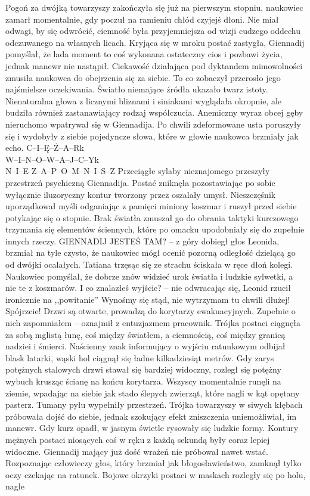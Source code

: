 \documentclass[../MAIN.tex]{subfiles}
\begin{document}
Pogoń za dwójką towarzyszy zakończyła się już na pierwszym stopniu, naukowiec zamarł momentalnie, gdy poczuł na ramieniu chłód czyjejś dłoni. Nie miał odwagi, by się odwrócić, ciemność była przyjemniejsza od wizji cudzego oddechu odczuwanego na własnych licach. Kryjąca się w mroku postać zastygła, Giennadij pomyślał, że lada moment to coś wykonana ostateczny cios i pozbawi życia, jednak manewr nie nastąpił. Ciekawość działająca pod dyktandem mimowolności zmusiła naukowca do obejrzenia się za siebie. To co zobaczył przerosło jego najśmielsze oczekiwania. Światło niemające źródła ukazało twarz istoty. Nienaturalna głowa z licznymi bliznami i siniakami wyglądała okropnie, ale budziła również zastanawiający rodzaj współczucia. Anemiczny wyraz obcej gęby nieruchomo wpatrywał się w Giennadija. Po chwili zdeformowane usta poruszyły się i wydobyły z siebie pojedyncze słowa, które w głowie naukowca brzmiały jak echo. 
\sw[14em]
C--I--Ę--Ż--A--R\3k\\
W--I--N--O--W--A--J--C--Y\3k\\
N--I--E Z--A--P--O--M--N--I--S--Z 
\qw
Przeciągłe sylaby nieznajomego przeszyły przestrzeń psychiczną Giennadija. Postać zniknęła pozostawiając po sobie wyłącznie iluzoryczny kontur tworzony przez oszalały umysł. Nieszczęśnik uporządkował myśli odganiając z pamięci miniony koszmar i ruszył przed siebie potykając się o stopnie. Brak światła zmuszał go do obrania taktyki kurczowego trzymania się elementów ściennych, które po omacku upodobniały się do zupełnie innych rzeczy. 
\sx GIENNADIJ JESTEŚ TAM? -- z góry dobiegł głos Leonida, brzmiał na tyle czysto, że naukowiec mógł ocenić pozorną odległość dzielącą go od dwójki ocalałych. 
\qd
Tatiana trzęsąc się ze strachu ściskała w ręce dłoń kolegi. Naukowiec pomyślał, że dobrze znów widzieć urok światła i ludzkie sylwetki, a nie te z koszmarów. 
\sx I co znalazłeś wyjście? -- nie odwracając się, Leonid rzucił ironicznie na ,,powitanie'' 
\xx Wynośmy się stąd, nie wytrzymam tu chwili dłużej! 
\xx Spójrzcie! Drzwi są otwarte, prowadzą do korytarzy ewakuacyjnych. Zupełnie o nich zapomniałem -- oznajmił z entuzjazmem pracownik.
\qd
Trójka postaci ciągnęła za sobą mglistą łunę, coś między światłem, a ciemnością, coś między granicą nadziei i śmierci. Naścienny znak informujący o wyjściu ratunkowym odbijał blask latarki, wąski hol ciągnął się ładne kilkadziesiąt metrów. Gdy zarys potężnych stalowych drzwi stawał się bardziej widoczny, rozległ się potężny wybuch krusząc ścianę na końcu korytarza. Wszyscy momentalnie runęli na ziemie, wpadając na siebie jak stado ślepych zwierząt, które nagli w kąt opętany pasterz. Tumany pyłu wypełniły przestrzeń. Trójka towarzyszy w siwych kłębach próbowała dojść do siebie, jednak szokujący efekt zniszczenia uniemożliwiał, im manewr. Gdy kurz opadł, w jasnym świetle rysowały się ludzkie formy. Kontury mężnych postaci niosących coś w ręku z każdą sekundą były coraz lepiej widoczne. Giennadij mający już dość wrażeń nie próbował nawet wstać. Rozpoznając człowieczy głos, który brzmiał jak błogosławieństwo, zamknął tylko oczy czekając na ratunek. Bojowe okrzyki postaci w maskach rozległy się po holu, nagle 
\end{document}
